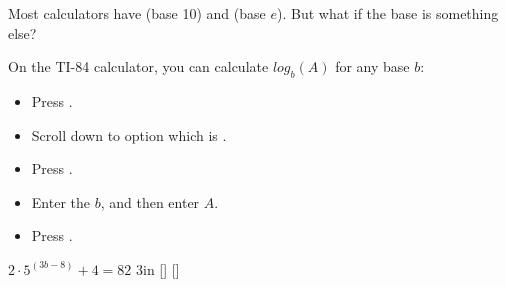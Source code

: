 Most calculators have  (base 10) and  (base $e$). 
But what if the base is something else?

\begin{tcolorbox}[center,colback=white,width=5in,]
    \small
    On the {\scshape TI-84} calculator, you can calculate $log_b(A)$ 
    for any base $b$:
    \begin{itemize}[nosep]
        \item Press .
        \item Scroll down to option  which is .
        \item Press .
        \item Enter the $b$, and then enter $A$.
        \item Press .
    \end{itemize}
\end{tcolorbox}

{
    $2\cdot 5^{(3b-8)} + 4 = 82$
}
{3in}
[]
[]


